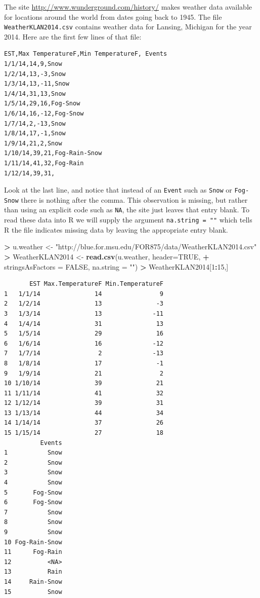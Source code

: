 \documentclass[]{krantz}
\makeatletter
\newenvironment{Shaded}{\begin{snugshade}}{\end{snugshade}}
\newcommand{\KeywordTok}[1]{\textcolor[rgb]{0.27,0.27,0.27}{\textbf{#1}}}
\newcommand{\DataTypeTok}[1]{\textcolor[rgb]{0.27,0.27,0.27}{#1}}
\newcommand{\DecValTok}[1]{\textcolor[rgb]{0.06,0.06,0.06}{#1}}
\newcommand{\StringTok}[1]{\textcolor[rgb]{0.5,0.5,0.5}{#1}}
\newcommand{\OtherTok}[1]{\textcolor[rgb]{0.37,0.37,0.37}{#1}}
\newcommand{\OperatorTok}[1]{\textcolor[rgb]{0.43,0.43,0.43}{\textbf{#1}}}
\newcommand{\NormalTok}[1]{#1}
\newenvironment{kframe}{%
\medskip{}
\setlength{\fboxsep}{.8em}
 \def\at@end@of@kframe{}%
 \ifinner\ifhmode%
  \def\at@end@of@kframe{\end{minipage}}%
  \begin{minipage}{\columnwidth}%
 \fi\fi%
 \def\FrameCommand##1{\hskip\@totalleftmargin \hskip-\fboxsep
 \colorbox{shadecolor}{##1}\hskip-\fboxsep
     \hskip-\linewidth \hskip-\@totalleftmargin \hskip\columnwidth}%
 \MakeFramed {\advance\hsize-\width
   \@totalleftmargin\z@ \linewidth\hsize
   \@setminipage}}%
 {\par\unskip\endMakeFramed%
 \at@end@of@kframe}
\renewenvironment{Shaded}{\begin{kframe}}{\end{kframe}}
\makeatother
\begin{document}
The site \url{http://www.wunderground.com/history/} makes weather data
available for locations around the world from dates going back to 1945.
The file \texttt{WeatherKLAN2014.csv} contains weather data for Lansing,
Michigan for the year 2014. Here are the first few lines of that file:

\begin{verbatim}
EST,Max TemperatureF,Min TemperatureF, Events
1/1/14,14,9,Snow
1/2/14,13,-3,Snow
1/3/14,13,-11,Snow
1/4/14,31,13,Snow
1/5/14,29,16,Fog-Snow
1/6/14,16,-12,Fog-Snow
1/7/14,2,-13,Snow
1/8/14,17,-1,Snow
1/9/14,21,2,Snow
1/10/14,39,21,Fog-Rain-Snow
1/11/14,41,32,Fog-Rain
1/12/14,39,31,
\end{verbatim}

Look at the last line, and notice that instead of an \texttt{Event} such
as \texttt{Snow} or \texttt{Fog-Snow} there is nothing after the comma.
This observation is missing, but rather than using an explicit code such
as \texttt{NA}, the site just leaves that entry blank. To read these
data into R we will supply the argument \texttt{na.string\ =\ ""} which
tells R the file indicates missing data by leaving the appropriate entry
blank.

\begin{Shaded}
\begin{Highlighting}[]
\OperatorTok{>}\StringTok{ }\NormalTok{u.weather <-}\StringTok{ "http://blue.for.msu.edu/FOR875/data/WeatherKLAN2014.csv"}
\OperatorTok{>}\StringTok{ }\NormalTok{WeatherKLAN2014 <-}\StringTok{ }\KeywordTok{read.csv}\NormalTok{(u.weather, }\DataTypeTok{header=}\OtherTok{TRUE}\NormalTok{, }
\OperatorTok{+}\StringTok{                             }\DataTypeTok{stringsAsFactors =} \OtherTok{FALSE}\NormalTok{, }\DataTypeTok{na.string =} \StringTok{""}\NormalTok{)}
\OperatorTok{>}\StringTok{ }\NormalTok{WeatherKLAN2014[}\DecValTok{1}\OperatorTok{:}\DecValTok{15}\NormalTok{,]}
\end{Highlighting}
\end{Shaded}

\begin{verbatim}
       EST Max.TemperatureF Min.TemperatureF
1   1/1/14               14                9
2   1/2/14               13               -3
3   1/3/14               13              -11
4   1/4/14               31               13
5   1/5/14               29               16
6   1/6/14               16              -12
7   1/7/14                2              -13
8   1/8/14               17               -1
9   1/9/14               21                2
10 1/10/14               39               21
11 1/11/14               41               32
12 1/12/14               39               31
13 1/13/14               44               34
14 1/14/14               37               26
15 1/15/14               27               18
          Events
1           Snow
2           Snow
3           Snow
4           Snow
5       Fog-Snow
6       Fog-Snow
7           Snow
8           Snow
9           Snow
10 Fog-Rain-Snow
11      Fog-Rain
12          <NA>
13          Rain
14     Rain-Snow
15          Snow
\end{verbatim}
\end{document}
